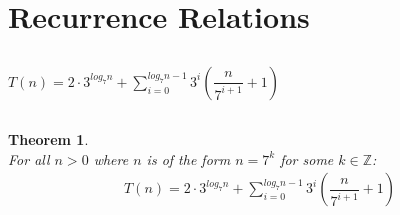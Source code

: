 \documentclass{article}
\newtheorem*{thm} {Theorem}
\begin{document}
\section{Recurrence Relations}
\subsection{}
	$T(n)=2\cdot3^{log_7{n}}+\sum\limits_{i=0}^{log_7{n}-1}3^i(\dfrac{n}{7^{i+1}}+1)$
\subsection{}
	\begin{thm}\ \\
		For all $n > 0$ where $n$ is of the form $n = 7^k$ for some $k \in \mathbb{Z}$:
		\begin{align*}
			T(n) = 2\cdot3^{log_7{n}}+\sum\limits_{i=0}^{log_7{n}-1}3^i(\dfrac{n}{7^{i+1}}+1)
		\end{align*}
	\end{thm}
\end{document}

